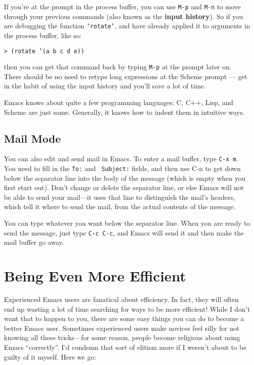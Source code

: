         If you're at the prompt in the process buffer, you can use
{\tt M-p} and {\tt M-n} to move through your previous commands (also
known as the {\bf input history}).  So if you are debugging the
function {\tt `rotate'}, and have already applied it to arguments in
the process buffer, like so:

\begin{screen}
   \begin{tt}
{\tt > (rotate '(a b c d e))}
   \end{tt}
\end{screen}

        then you can get that command back by typing {\tt M-p} at the
prompt later on.  There should be no need to retype long expressions
at the Scheme prompt --- get in the habit of using the input history
and you'll save a lot of time.

        Emacs knows about quite a few programming languages: C, C++,
Lisp, and Scheme are just some.  Generally, it knows how to indent
them in intuitive ways.

\subsection{Mail Mode}

        You can also edit and send mail in Emacs.  To enter a mail
buffer, type {\tt C-x~m}.  You need to fill in the {\tt To:} and {\tt
Subject:} fields, and then use C-n to get down below the separator
line into the body of the message (which is empty when you first start
out).  Don't change or delete the separator line, or else Emacs will
not be able to send your mail---it uses that line to distinguish
the mail's headers, which tell it where to send the mail, from the
actual contents of the message.

        You can type whatever you want below the separator line.  When
you are ready to send the message, just type {\tt C-c~C-c}, and Emacs
will send it and then make the mail buffer go away.

\section{Being Even More Efficient}

        Experienced Emacs users are fanatical about efficiency.  In
fact, they will often end up wasting a lot of time searching for ways
to be more efficient!  While I don't want that to happen to you, there
are some easy things you can do to become a better Emacs user.
Sometimes experienced users make novices feel silly for not knowing
all these tricks---for some reason, people become religious about
using Emacs ``correctly''.  I'd condemn that sort of elitism more if I
weren't about to be guilty of it myself.  Here we go:

